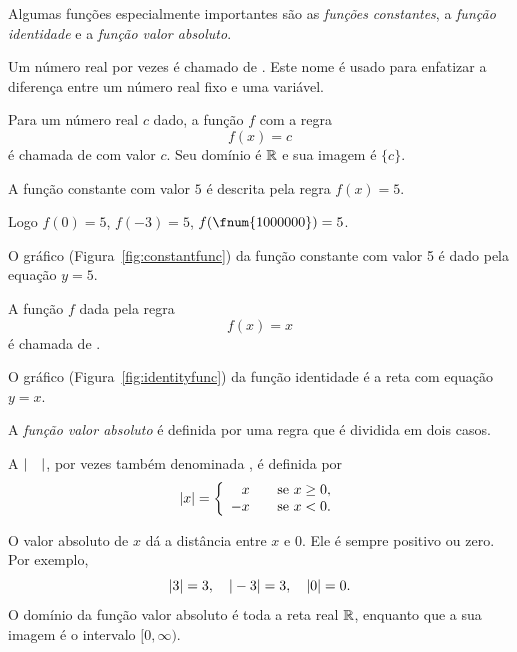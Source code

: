
Algumas funções especialmente importantes são as \emph{funções
constantes}, a \emph{função identidade} e a \emph{função valor
absoluto}.

Um número real por vezes é chamado de . Este
nome é usado para enfatizar a diferença entre um número real
fixo e uma variável.

Para um número real $c$ dado, a função $f$ com a regra
\[
  f(x) = c
\]
é chamada de  com
valor $c$. Seu domínio é $\mathbb{R}$ e sua imagem é $\{c\}$.

\begin{example}
\label{ex:constantfunc}
A função constante com valor $5$ é descrita pela regra $f(x) = 5.$

Logo \SPC $f(0) = 5$, \SPC $f(-3) = 5$, \SPC $f(\fnum{1000000}) = 5$.

O gráfico (Figura~\ref{fig:constantfunc}) da função constante com
valor 5 é dado pela equação $y=5$.
\end{example}

\begin{example}
\label{ex:identityfunc}
A função $f$ dada pela regra
\[
  f(x) = x
\]
é chamada de .

O gráfico (Figura~\ref{fig:identityfunc}) da função identidade é a
reta com equação $y=x$.
\end{example}


A \emph{função valor absoluto} é definida por uma regra que é
dividida em dois casos.

\begin{defin}
A  $|\hspace{1em}|$,
por vezes também denominada , é
definida por
\[
  |x| = \left\{
        \begin{array}{rl}
         x & \hspace{1em} \text{se } x \ge 0,\\
        -x & \hspace{1em} \text{se } x < 0.
        \end{array}
        \right.
\]
\end{defin}

O valor absoluto de $x$ dá a distância entre $x$ e $0$. Ele
é sempre positivo ou zero. Por exemplo,
\[
  |3| = 3, \hspace{1em} |-3| = 3, \hspace{1em} |0| = 0.
\]
O domínio da função valor absoluto é toda a reta real $\mathbb{R}$,
enquanto que a sua imagem é o intervalo $[0, \infty)$.

